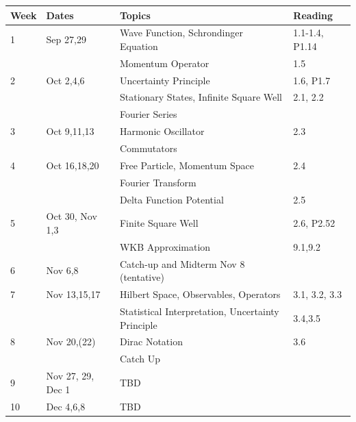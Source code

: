 \documentclass[12pt]{article}
\begin{document}
\noindent
\begin{tabular}{llll}
\textbf{Week} & \textbf{Dates} & \textbf{Topics} & \textbf{Reading} \\
\hline
1  & Sep 27,29         & Wave Function, Schrondinger Equation & 1.1-1.4, P1.14 \\
   &                   & Momentum Operator  & 1.5 \\
\hline
2  & Oct 2,4,6         & Uncertainty Principle & 1.6, P1.7 \\
   &                   & Stationary States, Infinite Square Well & 2.1, 2.2 \\
   &                   & Fourier Series   & \\
\hline
3  & Oct 9,11,13       & Harmonic Oscillator & 2.3 \\
   &                   & Commutators         &   \\
\hline
4  & Oct 16,18,20      & Free Particle, Momentum Space & 2.4 \\
   &                   & Fourier Transform  &  \\
   &                   & Delta Function Potential & 2.5 \\
\hline
5  & Oct 30, Nov 1,3   & Finite Square Well & 2.6, P2.52\\
   &                   & WKB Approximation & 9.1,9.2 \\
\hline
6  & Nov 6,8           & Catch-up and Midterm Nov 8 (tentative) \\
\hline
7  & Nov 13,15,17      & Hilbert Space, Observables, Operators & 3.1, 3.2, 3.3\\ 
   &                   & Statistical Interpretation, Uncertainty Principle & 3.4,3.5 \\
\hline
8  & Nov 20,(22)       & Dirac Notation & 3.6 \\
   &                   & Catch Up \\
\hline
9  & Nov 27, 29, Dec 1 & TBD \\
10 & Dec 4,6,8         & TBD \\
\hline
\end{tabular}\\ \vskip 1cm
\end{document}
